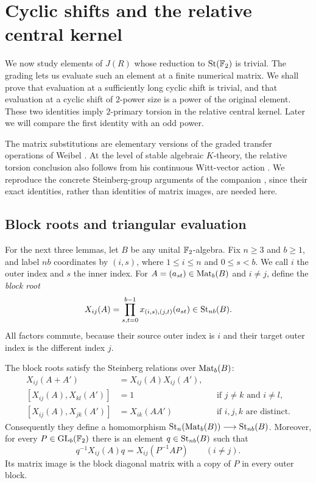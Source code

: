 \section{Cyclic shifts and the relative central kernel}\label{sec:shifts}

We now study elements of $J(R)$ whose reduction to $\operatorname{St}(\mathbb F_2)$ is
trivial.  The grading lets us evaluate such an element at a finite
numerical matrix.  We shall prove that evaluation at a sufficiently
long cyclic shift is trivial, and that evaluation at a cyclic shift
of $2$-power size is a power of the original element.  These two
identities imply $2$-primary torsion in the relative central kernel.
Later we will compare the first identity with an odd power.

The matrix substitutions are elementary versions of the graded
transfer operations of Weibel \cite[Section~1]{Weibel1987}.
At the level of stable algebraic $K$-theory, the relative torsion
conclusion also follows from his continuous Witt-vector action
\cite[Theorem~0.1]{Weibel1987}.
We reproduce the concrete Steinberg-group arguments of the companion
\cite[Lemmas~6.4--6.7]{Companion}, since their exact identities, rather
than identities of matrix images, are needed here.

\subsection{Block roots and triangular evaluation}

For the next three lemmas, let $B$ be any unital $\mathbb F_2$-algebra.
Fix $n\geq3$ and $b\geq1$, and label $nb$ coordinates by
$(i,s)$, where $1\leq i\leq n$ and $0\leq s<b$.
We call $i$ the outer index and $s$ the inner index.  For
$A=(a_{st})\in\operatorname{Mat}_b(B)$ and $i\ne j$, define the \emph{block root}
\[
 X_{ij}(A)=\prod_{s,t=0}^{b-1}
           x_{(i,s),(j,t)}(a_{st})\in\operatorname{St}_{nb}(B).
\]
All factors commute, because their source outer index is $i$ and
their target outer index is the different index $j$.

\begin{lemma}\label{lem:block-laws}
The block roots satisfy the Steinberg relations over $\operatorname{Mat}_b(B)$:
\begin{align*}
 X_{ij}(A+A')&=X_{ij}(A)X_{ij}(A'),\\
 [X_{ij}(A),X_{kl}(A')]&=1
       &&\text{if }j\ne k\text{ and }i\ne l,\\
 [X_{ij}(A),X_{jk}(A')]&=X_{ik}(AA')
       &&\text{if }i,j,k\text{ are distinct}.
\end{align*}
Consequently they define a homomorphism
$\operatorname{St}_n(\operatorname{Mat}_b(B))\longrightarrow\operatorname{St}_{nb}(B)$.
Moreover, for every $P\in\operatorname{GL}_b(\mathbb F_2)$ there is an element
$q\in\operatorname{St}_{nb}(B)$ such that
\[
 q^{-1}X_{ij}(A)q=X_{ij}(P^{-1}AP)
 \qquad(i\ne j).
\]
Its matrix image is the block diagonal matrix with a copy of $P$
in every outer block.
\end{lemma}

